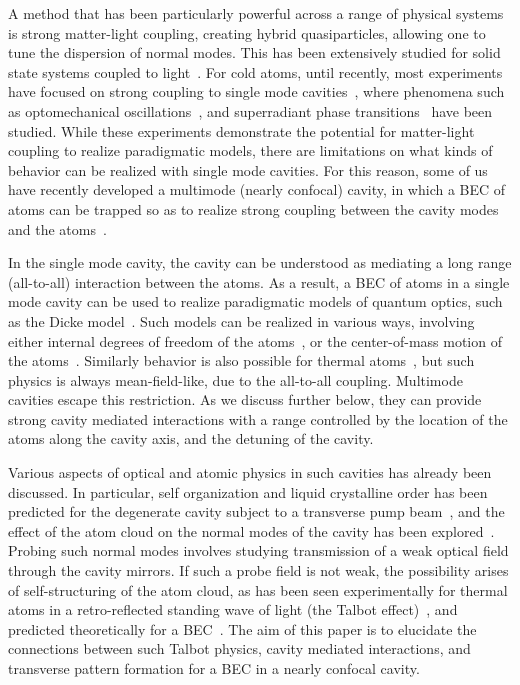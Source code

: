 \documentclass[pra,twocolumn,superscriptaddress]{revtex4-1}
\begin{document}
A method that has been particularly powerful across a range of
physical systems is strong matter-light coupling, creating hybrid
quasiparticles, allowing one to tune the dispersion of normal modes.
This has been extensively studied for solid state systems coupled to
light~\cite{Carusotto2013a}.  For cold atoms, until recently, most
experiments have focused on strong coupling to single mode
cavities~\cite{Brennecke2007}, where phenomena such as optomechanical
oscillations~\cite{Brennecke:Opto}, and superradiant phase
transitions~\cite{Black:SO,Baumann2010,Baumann2011} have been studied.
While these experiments demonstrate the potential for matter-light
coupling to realize paradigmatic models, there are limitations on what
kinds of behavior can be realized with single mode cavities.  For
this reason, some of us have recently developed a multimode (nearly
confocal) cavity, in which a BEC of atoms can be trapped so as to
realize strong coupling between the cavity modes and the
atoms~\cite{Kollar2014}.  


In the single mode cavity, the cavity can be understood as mediating a
long range (all-to-all) interaction between the atoms. As a result, a
BEC of atoms in a single mode cavity can be used to realize
paradigmatic models of quantum optics, such as the Dicke
model~\cite{Dimer2007}.  Such models can be realized in various ways,
involving either internal degrees of freedom of the
atoms~\cite{Dimer2007,Baden2014}, or the center-of-mass motion of the
atoms~\cite{Baumann2010,Nagy2010,Keeling2010}.  Similarly behavior is
also possible for thermal
atoms~\cite{Domokos2002,Black:SO,Piazza2013}, but such physics is
always mean-field-like, due to the all-to-all coupling.  Multimode
cavities escape this restriction.  As we discuss further below, they
can provide strong cavity mediated interactions with a range
controlled by the location of the atoms along the cavity axis, and the
detuning of the cavity.

Various aspects of optical and atomic physics in such cavities has
already been discussed.  In particular, self organization and liquid
crystalline order has been predicted for the degenerate cavity subject
to a transverse pump
beam~\cite{Gopalakrishnan2009,Gopalakrishnan2010}, and the effect of
the atom cloud on the normal modes of the cavity has been
explored~\cite{Wickenbrock2013a}.  Probing such normal modes involves
studying transmission of a weak optical field through the cavity
mirrors.  If such a probe field is not weak, the possibility arises of
self-structuring of the atom cloud, as has been seen experimentally
for thermal atoms in a retro-reflected standing wave of light (the
Talbot effect)~\cite{Diver2014,Labeyrie2014}, and predicted
theoretically for a BEC~\cite{Robb2015}.  The aim of this paper is to
elucidate the connections between such Talbot physics, cavity mediated
interactions, and transverse pattern formation for a BEC in a nearly
confocal cavity.
\end{document}
